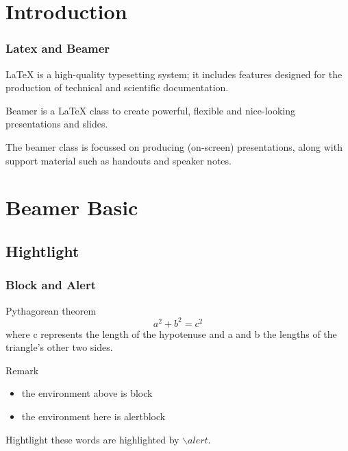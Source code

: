 \frame[plain]{\titlepage}

\section{Introduction}

\begin{frame}
    \frametitle{Latex and Beamer}
    
    LaTeX is a high-quality typesetting system; 
    it includes features designed for the production of 
    technical and scientific documentation.

    \vspace{0.4cm}

    \pause

    Beamer is a LaTeX class to create powerful, 
    flexible and nice-looking presentations and slides. 
    
    The beamer class is focussed on producing (on-screen) presentations, 
    along with support material such as handouts and speaker notes.
    
\end{frame}

\section{Beamer Basic}
\subsection{Hightlight}

\begin{frame}
    \frametitle{Block and Alert}
        
    \vspace{-1.1cm}

    \begin{block}{Pythagorean theorem}
        \vspace*{-\baselineskip}\setlength\belowdisplayshortskip{0.6pt}
        $$a^2 + b^2 = c^2$$
        where c represents the length of the hypotenuse and 
        a and b the lengths of the triangle's other two sides.
    \end{block}
    
    \begin{alertblock}{Remark}
        \begin{itemize}
            \item the environment above is \alert{block}
            \item the environment here is \alert{alertblock}
        \end{itemize}
    \end{alertblock}

    \alert{Hightlight} these words are highlighted by $\backslash alert$.
\end{frame}

